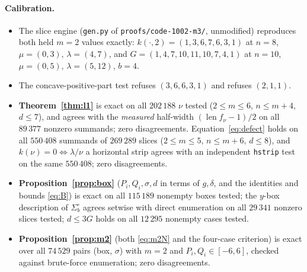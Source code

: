 \documentclass[11pt]{article}
\theoremstyle{definition}
\begin{document}
\paragraph{Calibration.}
\begin{itemize}
\item The slice engine (\texttt{gen.py} of \verb|proofs/code-1002-m3/|, unmodified)
reproduces both held $m=2$ values exactly: $k(\cdot,2)=(1,3,6,7,6,3,1)$ at $n=8$,
$\mu=(0,3)$, $\lambda=(4,7)$, and $G=(1,4,7,10,11,10,7,4,1)$ at $n=10$, $\mu=(0,5)$,
$\lambda=(5,12)$, $b=4$.
\item The concave-positive-part test refuses $(3,6,6,3,1)$ and refuses $(2,1,1)$.
\item \textbf{Theorem~\ref{thm:l1}} is exact on all $202\,188$ $\nu$ tested
($2\le m\le6$, $n\le m+4$, $d\le7$), and agrees with the \emph{measured} half-width
$(\operatorname{len}f_\nu-1)/2$ on all $89\,377$ nonzero summands; zero disagreements.
Equation~\eqref{eq:defect} holds on all $550\,408$ summands of $269\,289$ slices
($2\le m\le5$, $n\le m+6$, $d\le8$), and $k(\nu)=0\Leftrightarrow\lambda/\nu$ a
horizontal strip agrees with an independent \texttt{hstrip} test on the same
$550\,408$; zero disagreements.
\item \textbf{Proposition~\ref{prop:box}} ($P_i,Q_i,\sigma,d$ in terms of $g,\delta$,
and the identities and bounds \eqref{eq:B}) is exact on all $115\,189$ nonempty boxes
tested; the $y$-box description of $\Sigma_b^\circ$ agrees setwise with direct
enumeration on all $29\,341$ nonzero slices tested; $d\le3G$ holds on all $12\,295$
nonempty cases tested.
\item \textbf{Proposition~\ref{prop:m2}} (both \eqref{eq:m2N} and the four-case
criterion) is exact over all $74\,529$ pairs (box, $\sigma$) with $m=2$ and
$P_i,Q_i\in[-6,6]$, checked against brute-force enumeration; zero disagreements.
\end{itemize}
\end{document}
